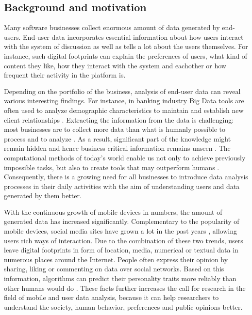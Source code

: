 \subsection{Background and motivation}
	Many software businesses collect enormous amount of data generated by end-users. End-user data incorporates essential information about how users interact with the system of discussion as well as tells a lot about the users themselves. For instance, such digital footprints can explain the preferences of users, what kind of content they like, how they interact with the system and eachother or how frequent their activity in the platform is.
    
    Depending on the portfolio of the business, analysis of end-user data can reveal various interesting findings. For instance, in banking industry Big Data tools are often used to analyze demographic characteristics to maintain and establish new client relationships \cite{chinesemobilebankingusers, bigdatamanagementrevolution}. Extracting the information from the data is challenging: most businesses are to collect more data than what is humanly possible to process and to analyze \cite{inmon2007tapping, wegener2010integrating}. As a result, significant part of the knowledge might remain hidden and hence business-critical information remains unseen \cite{inmon2007tapping, wegener2010integrating, introtodatamining, chinesemobilebankingusers}. The computational methods of today's world enable us not only to achieve previously impossible tasks, but also to create tools that may outperform humans \cite{youyou2015computer}. Consequently, there is a growing need for all businesses to introduce data analysis processes in their daily activities with the aim of understanding users and data generated by them better.
    
    With the continuous growth of mobile devices in numbers, the amount of generated data has increased significantly. Complementary to the popularity of mobile devices, social media sites have grown a lot in the past years \cite{ottoni2013ladies, hu2014we, bakhshi2014faces, waheed2017investigation}, allowing users rich ways of interaction. Due to the combination of these two trends, users leave digital footprints in form of location, media, numerical or textual data in numerous places around the Internet. People often express their opinion by sharing, liking or commenting on data over social networks. Based on this information, algorithms can predict their personality traits more reliably than other humans would do \cite{youyou2015computer}. These facts further increases the call for research in the field of mobile and user data analysis, because it can help researchers to understand the society, human behavior, preferences and public opinions better.

